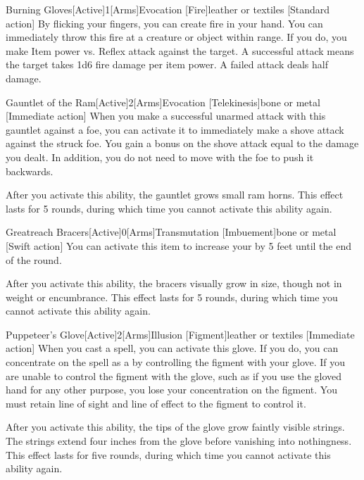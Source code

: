         \begin{magicitemdef}{Burning Gloves}[Active]{1}[Arms]{Evocation [Fire]}{leather or textiles}
            [Standard action] By flicking your fingers, you can create fire in your hand.
            You can immediately throw this fire at a creature or object within \rngmed range.
            If you do, you make Item power vs. Reflex attack against the target.
            A successful attack means the target takes 1d6 fire damage per item power.
            A failed attack deals half damage.
        \end{magicitemdef}

        \begin{magicitemdef}{Gauntlet of the Ram}[Active]{2}[Arms]{Evocation [Telekinesis]}{bone or metal}
            [Immediate action] When you make a successful unarmed attack with this gauntlet against a foe, you can activate it to immediately make a shove attack against the struck foe.
            You gain a bonus on the shove attack equal to the damage you dealt.
            In addition, you do not need to move with the foe to push it backwards.

            After you activate this ability, the gauntlet grows small ram horns.
            This effect lasts for 5 rounds, during which time you cannot activate this ability again.
        \end{magicitemdef}

        \begin{magicitemdef}{Greatreach Bracers}[Active]{0}[Arms]{Transmutation [Imbuement]}{bone or metal}
            [Swift action] You can activate this item to increase your  by 5 feet until the end of the round.

            After you activate this ability, the bracers visually grow in size, though not in weight or encumbrance.
            This effect lasts for 5 rounds, during which time you cannot activate this ability again.
        \end{magicitemdef}

        \begin{magicitemdef}{Puppeteer's Glove}[Active]{2}[Arms]{Illusion [Figment]}{leather or textiles}
            [Immediate action] When you cast a  spell, you can activate this glove.
            If you do, you can concentrate on the spell as a  by controlling the figment with your glove.
            If you are unable to control the figment with the glove, such as if you use the gloved hand for any other purpose, you lose your concentration on the figment.
            You must retain line of sight and line of effect to the figment to control it.

            After you activate this ability, the tips of the glove grow faintly visible strings.
            The strings extend four inches from the glove before vanishing into nothingness.
            This effect lasts for five rounds, during which time you cannot activate this ability again.
        \end{magicitemdef}

